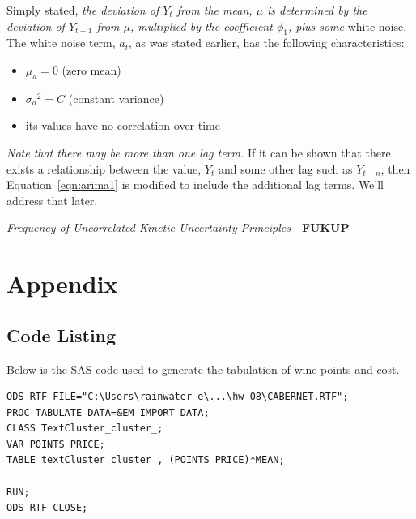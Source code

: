 \documentclass[12pt]{article}
\begin{document}
Simply stated, \textit{the deviation of $Y_t$ from the mean, $\mu$ is determined by the deviation of $Y_{t-1}$ from $\mu$, multiplied by the coefficient $\phi_1$, plus some} white noise.
The white noise term, $a_t$, as was stated earlier, has the following characteristics:
\begin{itemize}
\item $\mu_a = 0$ (zero mean)
\item ${\sigma_a}^2 = C$ (constant variance)
\item its values have no correlation over time
\end{itemize}
\textit{Note that there may be more than one lag term.} If it can be shown that there exists a relationship between the value, $Y_t$ and some other lag such as $Y_{t-n}$, then Equation~\ref{eqn:arima1} is modified to include the additional lag terms. We'll address that later.


\textit{Frequency of Uncorrelated Kinetic Uncertainty Principles}---\textbf{FUKUP}

%


\section{Appendix}




\subsection{Code Listing}
Below is the SAS code used to generate the tabulation of wine points and cost.

{\tiny{}}
\begin{lstlisting}
ODS RTF FILE="C:\Users\rainwater-e\...\hw-08\CABERNET.RTF";
PROC TABULATE DATA=&EM_IMPORT_DATA;
CLASS TextCluster_cluster_;
VAR POINTS PRICE;
TABLE textCluster_cluster_, (POINTS PRICE)*MEAN;

RUN;
ODS RTF CLOSE;
\end{lstlisting}
\pagebreak
\end{document}
